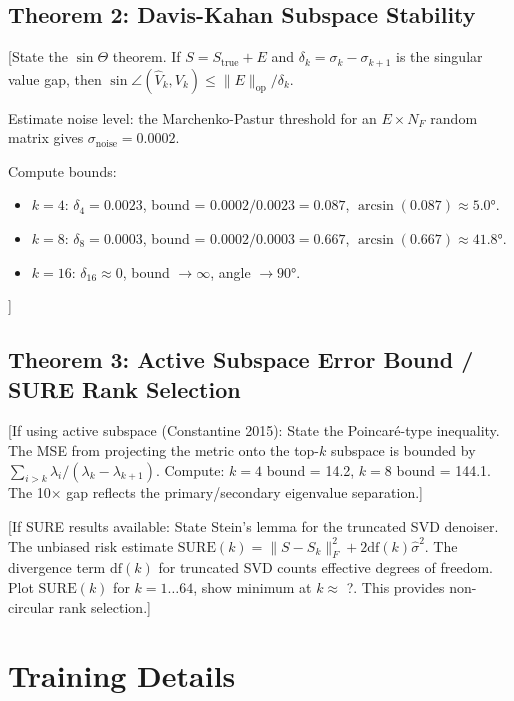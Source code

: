 \documentclass[11pt]{article}
\begin{document}
\subsection{Theorem 2: Davis-Kahan Subspace Stability}

[State the $\sin\Theta$ theorem. If $S = S_{\text{true}} + E$ and
$\delta_k = \sigma_k - \sigma_{k+1}$ is the singular value gap, then
$\sin\angle(\hat{V}_k, V_k) \leq \|E\|_{\text{op}} / \delta_k$.

Estimate noise level: the Marchenko-Pastur threshold for an
$E \times N_F$ random matrix gives $\sigma_{\text{noise}} = 0.0002$.

Compute bounds:
\begin{itemize}
\item $k=4$: $\delta_4 = 0.0023$, bound = $0.0002 / 0.0023 = 0.087$,
  $\arcsin(0.087) \approx 5.0°$.
\item $k=8$: $\delta_8 = 0.0003$, bound = $0.0002 / 0.0003 = 0.667$,
  $\arcsin(0.667) \approx 41.8°$.
\item $k=16$: $\delta_{16} \approx 0$, bound $\to \infty$, angle $\to 90°$.
\end{itemize}]

\subsection{Theorem 3: Active Subspace Error Bound / SURE Rank Selection}

[If using active subspace (Constantine 2015):
State the Poincar\'{e}-type inequality. The MSE from projecting the
metric onto the top-$k$ subspace is bounded by $\sum_{i>k} \lambda_i /
(\lambda_k - \lambda_{k+1})$. Compute: $k=4$ bound = 14.2, $k=8$
bound = 144.1. The 10$\times$ gap reflects the primary/secondary
eigenvalue separation.]

[If SURE results available:
State Stein's lemma for the truncated SVD denoiser. The unbiased risk
estimate $\text{SURE}(k) = \|S - S_k\|_F^2 + 2 \text{df}(k) \hat\sigma^2$.
The divergence term $\text{df}(k)$ for truncated SVD counts effective
degrees of freedom. Plot $\text{SURE}(k)$ for $k = 1 \ldots 64$, show
minimum at $k \approx$ ?.  This provides non-circular rank selection.]



\section{Training Details}
\label{app:training}
\end{document}
